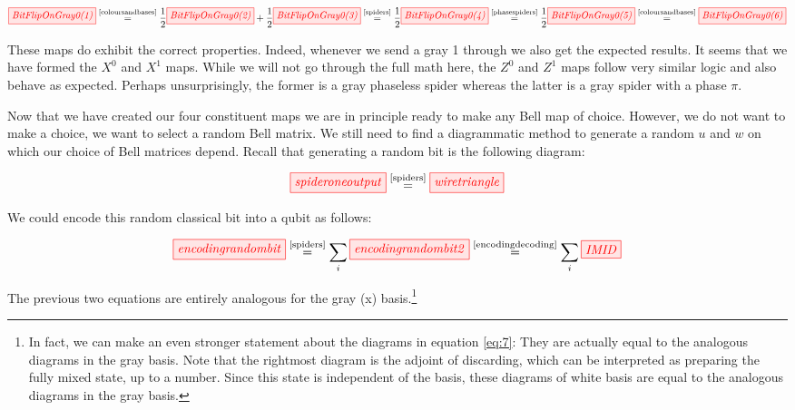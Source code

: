 \documentclass[]{article}
\newcommand{\equaltext}[1]{\ensuremath{\stackrel{\text{#1}}{=}}}
\begin{document}
\begin{equation}
\label{equation:bitflip}
\tikzfig{BitFlipOnGray0(1)} \equaltext{\ref{coloursandbases}} \frac{1}{2}\tikzfig{BitFlipOnGray0(2)} + \frac{1}{2}\tikzfig{BitFlipOnGray0(3)} 
\equaltext{\ref{spiders}}
\frac{1}{2}
\tikzfig{BitFlipOnGray0(4)} 
\equaltext{\ref{phasespiders}}
\frac{1}{2}
\tikzfig{BitFlipOnGray0(5)} 
\equaltext{\ref{coloursandbases}}
\tikzfig{BitFlipOnGray0(6)}
\end{equation}

These maps do exhibit the correct properties. Indeed, whenever we send a gray 1 through we also get the expected results. It seems that we have formed the $X^0$ and $X^1$ maps. While we will not go through the full math here, the $Z^0$ and $Z^1$ maps follow very similar logic and also behave as expected. Perhaps unsurprisingly, the former is a gray phaseless spider whereas the latter is a gray spider with a phase $\pi$.


Now that we have created our four constituent maps we are in principle ready to make any Bell map of choice. However, we do not want to make a choice, we want to select a random Bell matrix. We still need to find a diagrammatic method to generate a random $u$ and $w$ on which our choice of Bell matrices depend. Recall that generating a random bit is the following diagram: 

\begin{equation}
	\tikzfig{spideroneoutput} \equaltext{\ref{spiders}} \tikzfig{wiretriangle}
\end{equation}

We could encode this random classical bit into a qubit as follows:

\begin{equation}
	\label{eq:7}
	\tikzfig{encodingrandombit} \equaltext{\ref{spiders}} \sum\limits_{i} \tikzfig{encodingrandombit2} \equaltext{\ref{encodingdecoding}} \sum\limits_{i} \tikzfig{IMID}
\end{equation}

The previous two equations are entirely analogous for the gray (x) basis.\footnote{In fact, we can make an even stronger statement about the diagrams in equation \ref{eq:7}: They are actually equal to the analogous diagrams in the gray basis. Note that the rightmost diagram is the adjoint of discarding, which can be interpreted as preparing the fully mixed state, up to a number. Since this state is independent of the basis, these diagrams of white basis are equal to the analogous diagrams in the gray basis.}
\end{document}
